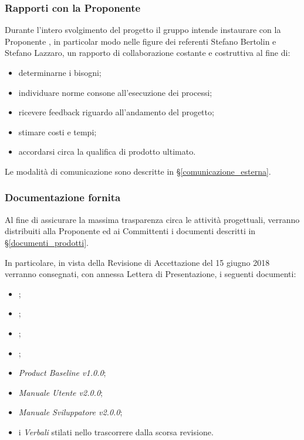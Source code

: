 		\subsubsection{Rapporti con la Proponente}

			Durante l'intero svolgimento del progetto il gruppo intende instaurare con la Proponente \Proponente{},
			in particolar modo nelle figure dei referenti Stefano Bertolin e Stefano Lazzaro, un rapporto di collaborazione
			costante e costruttiva al fine di:

			\begin{itemize}
				\item determinarne i bisogni;
				\item individuare norme consone all'esecuzione dei processi;
				\item ricevere feedback riguardo all'andamento del progetto;
				\item stimare costi e tempi;
				\item accordarsi circa la qualifica di prodotto ultimato.
			\end{itemize}
			
			Le modalità di comunicazione sono descritte in §\ref{comunicazione_esterna}.
		
		\subsubsection{Documentazione fornita}

			Al fine di assicurare la massima trasparenza circa le attività progettuali, verranno distribuiti alla Proponente \Proponente{}
			ed ai Committenti \Committenteinriga{} i documenti descritti in §\ref{documenti_prodotti}.
			
			In particolare, in vista della Revisione di Accettazione del 15 giugno 2018 verranno consegnati, con annessa Lettera di
			Presentazione, i seguenti documenti:

			\begin{itemize}
				\item \vNormeDiProgetto{};
				\item \vAnalisiDeiRequisiti{};
				\item \vPianoDiProgetto{};
				\item \vPianoDiQualifica{};
				\item \textit{Product Baseline v1.0.0};
				\item \textit{Manuale Utente v2.0.0};
				\item \textit{Manuale Sviluppatore v2.0.0};
				\item i \textit{Verbali} stilati nello trascorrere dalla scorsa revisione.
			\end{itemize}

